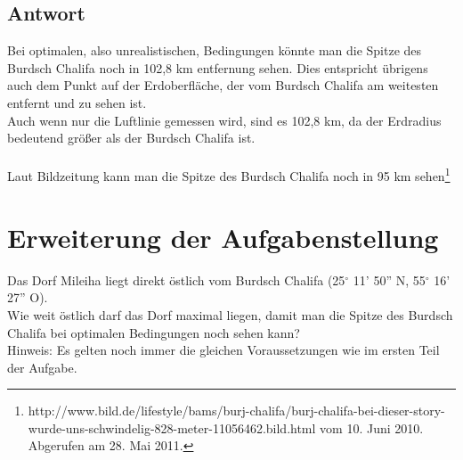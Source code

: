 \documentclass[a4paper,9pt]{scrartcl}
\begin{document}
    \subsection{Antwort}
        Bei optimalen, also unrealistischen, Bedingungen könnte man die Spitze 
        des Burdsch Chalifa noch in 102,8 km entfernung sehen. Dies entspricht 
        übrigens auch dem Punkt auf der Erdoberfläche, der vom Burdsch Chalifa 
        am weitesten entfernt und zu sehen ist.\\
        Auch wenn nur die Luftlinie gemessen wird, sind es 102,8 km, da der 
        Erdradius bedeutend größer als der Burdsch Chalifa ist.\\
        \\
        Laut Bildzeitung kann man die Spitze des Burdsch Chalifa noch in 95 km 
        sehen\footnote{http://www.bild.de/lifestyle/bams/burj-chalifa/burj-chalifa-bei-dieser-story-wurde-uns-schwindelig-828-meter-11056462.bild.html vom 10. Juni 2010. Abgerufen am 28. Mai 2011.}

 \section{Erweiterung der Aufgabenstellung}
    Das Dorf Mileiha liegt direkt östlich vom Burdsch Chalifa 
    (25$^\circ$ 11' 50'' N, 55$^\circ$ 16' 27'' O). \\
    Wie weit östlich darf das Dorf maximal liegen, damit man die Spitze des 
    Burdsch Chalifa bei optimalen Bedingungen noch sehen kann?\\
    Hinweis: Es gelten noch immer die gleichen Voraussetzungen wie im ersten 
    Teil der Aufgabe.
\end{document}
